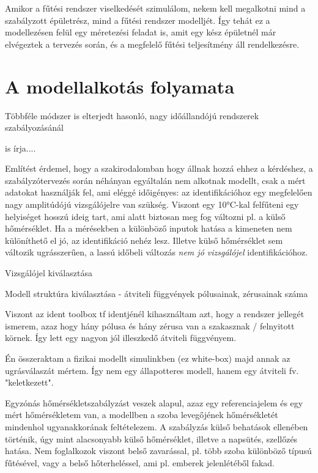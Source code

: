 Amikor a fűtési rendszer viselkedését szimulálom, nekem kell megalkotni mind a szabályzott épületrész, mind a fűtési rendszer modelljét. Így tehát ez a modellezésen felül egy méretezési feladat is, amit egy kész épületnél már elvégeztek a tervezés során, és a megfelelő fűtési teljesítmény áll rendelkezésre. %

\section{A modellalkotás folyamata}
%

Többféle módszer is elterjedt hasonló, nagy időállandójú rendszerek szabályozásánál \cite{THIEBLEMONT2017485}

\cite{SCHIRRER201686} is írja....



Említést érdemel, hogy a szakirodalomban hogy állnak hozzá ehhez a kérdéshez, a szabályzótervezés során néhányan egyáltalán nem alkotnak modellt, csak a mért adatokat használják fel, ami eléggé időigényes: az identifikációhoz egy megfelelően nagy amplitúdójú vizsgálójelre van szükség. Viszont egy 10\si{\celsius}-kal felfűteni egy helyiséget hosszú ideig tart, ami alatt biztosan meg fog változni pl. a külső hőmérséklet. Ha a mérésekben a különböző inputok hatása a kimeneten nem különíthető el jó, az identifikáció nehéz lesz. Illetve külső hőmérséklet sem változik ugrásszerűen, a lassú időbeli változás \textit{nem jó vizsgálójel} identifikációhoz.

Vizsgálójel kiválasztása

Modell struktúra kiválasztása - átviteli függvények pólusainak, zérusainak száma


Viszont az ident toolbox tf identjénél kihasználtam azt, hogy a rendszer jellegét ismerem, azaz hogy hány pólusa és hány zérusa van a szakasznak  / felnyitott körnek. Így lett egy nagyon jól illeszkedő átviteli függvényem.

Én összeraktam a fizikai modellt simulinkben (ez white-box) majd annak az ugrásválaszát mértem. Így nem egy állapotteres modell, hanem egy átviteli fv. "keletkezett".


Egyzónás hőmérsékletszabályzást veszek alapul, azaz egy referenciajelem és egy mért hőmérsékletem van, a modellben a szoba levegőjének hőmérsékletét mindenhol ugyanakkorának feltételezem. A szabályzás külső behatások ellenében történik, úgy mint alacsonyabb külső hőmérséklet, illetve a napsütés, szellőzés hatása. Nem foglalkozok viszont belső zavarással, pl. több szoba különböző típusú fűtésével, vagy a belső hőterheléssel, ami pl. emberek jelenlétéből fakad.

